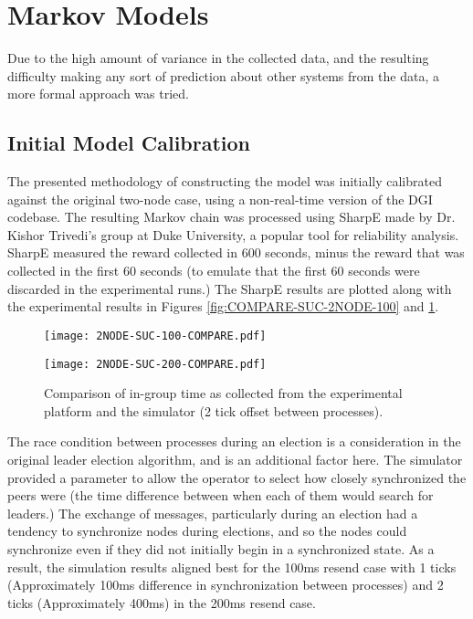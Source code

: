 \section{Markov Models}

Due to the high amount of variance in the collected data, and the resulting
difficulty making any sort of prediction about other systems from the data, a
more formal approach was tried.

\subsection{Initial Model Calibration}
The presented methodology of constructing the model was initially calibrated against the
original two-node case, using a non-real-time version of the DGI codebase. The resulting
Markov chain was processed using SharpE \cite{SHARPE}\cite{SHARPE2} made by Dr. Kishor
Trivedi's group at Duke University, a popular tool for reliability analysis. SharpE measured the reward collected in 600 seconds,
minus the reward that was collected in the first 60 seconds (to emulate that the first
60 seconds were discarded in the experimental runs.) The SharpE results are plotted along
with the experimental results in Figures \ref{fig:COMPARE-SUC-2NODE-100} and \ref{fig:COMPARE-SUC-2NODE-200}.

\begin{figure}
\centering
\begin{minipage}{0.45\textwidth}
    \centering
    \texttt{[image: 2NODE-SUC-100-COMPARE.pdf]}
    \caption{Comparison of in-group time as collected from the experimental platform and the simulator (1 tick offset between processes).}
    \label{fig:COMPARE-SUC-2NODE-100}
\end{minipage}%
\qquad
\begin{minipage}{0.45\textwidth}
    \centering
    \texttt{[image: 2NODE-SUC-200-COMPARE.pdf]}
    \caption{Comparison of in-group time as collected from the experimental platform and the simulator (2 tick offset between processes).}
    \label{fig:COMPARE-SUC-2NODE-200}
\end{minipage}
\end{figure}

The race condition between processes during an election is a consideration in the original
leader election algorithm, and is an additional factor here. The simulator provided a parameter
to allow the operator to select how closely synchronized the peers were (the time difference
between when each of them would search for leaders.) The exchange of messages, particularly
during an election had a tendency to synchronize nodes during elections, and so the nodes could
synchronize even if they did not initially begin in a synchronized state. As a result, the
simulation results aligned best for the 100ms resend case with 1 ticks (Approximately 100ms
difference in synchronization between processes) and 2 ticks (Approximately 400ms) in the 200ms
resend case.

